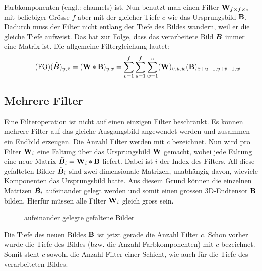 Farbkomponenten (engl.: channels) ist.
Nun benutzt man einen Filter $\mathbf{W}_{f \times f \times c}$ mit beliebiger Grösse
$f$ aber mit der gleicher Tiefe $c$ wie das Ursprungsbild $\mathbf{B}$.
Dadurch muss der Filter nicht entlang der Tiefe des Bildes wandern, weil er
die gleiche Tiefe aufweist. Das hat zur Folge, dass das verarbeitete
Bild $\tilde{\bm{B}}$ immer eine Matrix ist.
Die allgemeine Filtergleichung lautet:
\\
\begin{equation}\tag{FO}
  (\tilde{\bm{B}})_{y,x} = (\mathbf{W} * \mathbf{B})_{y,x} = \sum_{v=1}^{f} \sum_{u=1}^{f} \sum_{w=1}^c (\mathbf{W})_{v,u,w} (\mathbf{B})_{x+u-1,y+v-1,w}
\end{equation}

\para{}
\cite{Goodfellow-et-al-2016}
\cite{deeplearning.ai:cnn}
\cite{wiki:cnn}

\subsection{Mehrere Filter}
Eine Filteroperation ist nicht auf einen einzigen Filter beschränkt. Es können
mehrere Filter auf das gleiche Ausgangsbild angewendet werden und zusammen ein
Endbild erzeugen.
\para{}
Die Anzahl Filter werden mit $c$ bezeichnet.
Nun wird pro Filter $\mathbf{W}_i$ eine Faltung über das Ursprungsbild $\mathbf{W}$ gemacht, wobei
jede Faltung eine neue Matrix $\tilde{\bm{B}}_i = \mathbf{W}_i * \mathbf{B}$ liefert.
Dabei ist $i$ der Index des Filters. All diese gefalteten Bilder
$\tilde{\bm{B}}_i$ sind zwei-dimensionale Matrizen, unabhängig davon, wieviele
Komponenten das Ursprungsbild hatte. Aus diesem Grund können die einzelnen
Matrizen $\tilde{\bm{B}}_i$ aufeinander gelegt werden und somit einen grossen 3D-Endtensor
$\tilde{\mathbf{B}}$ bilden.
Hierfür müssen alle Filter $\mathbf{W}_i$ gleich gross sein.
\begin{figure}[h!]
  \caption{aufeinander gelegte gefaltene Bilder}

\end{figure}
Die Tiefe des neuen Bildes $\tilde{\mathbf{B}}$ ist jetzt gerade die Anzahl Filter $c$.
Schon vorher wurde die Tiefe des Bildes (bzw. die Anzahl
Farbkomponenten) mit $c$ bezeichnet. Somit steht $c$ sowohl die Anzahl Filter
einer Schicht, wie auch für die Tiefe des verarbeiteten Bildes.

\para{}
\cite{Goodfellow-et-al-2016}
\cite{deeplearning.ai:cnn}

